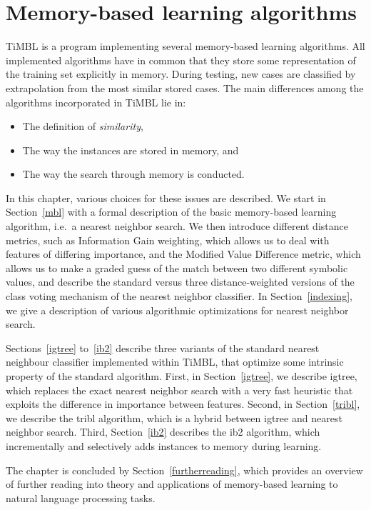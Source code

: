 \documentclass{report}
\begin{document}
\chapter{Memory-based learning algorithms}
\label{algorithms}

TiMBL is a program implementing several memory-based learning
algorithms. All implemented algorithms have in common that they store some
representation of the training set explicitly in memory. During
testing, new cases are classified by extrapolation from the most
similar stored cases. The main differences among the algorithms
incorporated in TiMBL lie in:

\begin{itemize}
\item The definition of {\em similarity},
\item The way the instances are stored in memory, and
\item The way the search through memory is conducted.
\end{itemize}

In this chapter, various choices for these issues are described. We
start in Section~\ref{mbl} with a formal description of the basic
memory-based learning algorithm, i.e.~a nearest neighbor search. We
then introduce different distance metrics, such as Information Gain
weighting, which allows us to deal with features of differing
importance, and the Modified Value Difference metric, which allows us
to make a graded guess of the match between two different symbolic
values, and describe the standard versus three distance-weighted
versions of the class voting mechanism of the nearest neighbor
classifier. In Section~\ref{indexing}, we give a description of
various algorithmic optimizations for nearest neighbor search.

Sections~\ref{igtree} to~\ref{ib2} describe three variants of the
standard nearest neighbour classifier implemented within TiMBL, that
optimize some intrinsic property of the standard algorithm. First, in
Section~\ref{igtree}, we describe {\sc igtree}, which replaces the
exact nearest neighbor search with a very fast heuristic that exploits
the difference in importance between features. Second, in
Section~\ref{tribl}, we describe the {\sc tribl} algorithm, which is a
hybrid between {\sc igtree} and nearest neighbor search. Third,
Section~\ref{ib2} describes the {\sc ib2} algorithm, which
incrementally and selectively adds instances to memory during
learning.

The chapter is concluded by Section~\ref{furtherreading}, which
provides an overview of further reading into theory and applications
of memory-based learning to natural language processing tasks.
\end{document}
